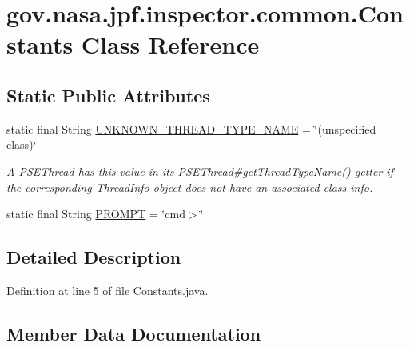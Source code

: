 \hypertarget{classgov_1_1nasa_1_1jpf_1_1inspector_1_1common_1_1_constants}{}\section{gov.\+nasa.\+jpf.\+inspector.\+common.\+Constants Class Reference}
\label{classgov_1_1nasa_1_1jpf_1_1inspector_1_1common_1_1_constants}
\subsection*{Static Public Attributes}
\begin{DoxyCompactItemize}
\item 
static final String \hyperlink{classgov_1_1nasa_1_1jpf_1_1inspector_1_1common_1_1_constants_a16af7f4c4a75ed492edd02df8515c86c}{U\+N\+K\+N\+O\+W\+N\+\_\+\+T\+H\+R\+E\+A\+D\+\_\+\+T\+Y\+P\+E\+\_\+\+N\+A\+ME} = \char`\"{}(unspecified class)\char`\"{}
\begin{DoxyCompactList}\small\item\em A \hyperlink{}{P\+S\+E\+Thread} has this value in its \hyperlink{classgov_1_1nasa_1_1jpf_1_1inspector_1_1common_1_1pse_1_1_p_s_e_thread_a6427e811af26702eb971fe73ded1d651}{P\+S\+E\+Thread\#get\+Thread\+Type\+Name()} getter if the corresponding Thread\+Info object does not have an associated class info. \end{DoxyCompactList}\item 
static final String \hyperlink{classgov_1_1nasa_1_1jpf_1_1inspector_1_1common_1_1_constants_a174df8b119198d4444a023ee59e74a71}{P\+R\+O\+M\+PT} = \char`\"{}cmd$>$\char`\"{}
\end{DoxyCompactItemize}


\subsection{Detailed Description}


Definition at line 5 of file Constants.\+java.



\subsection{Member Data Documentation}
